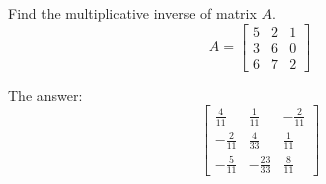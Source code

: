 
\begin{question}
Find the multiplicative inverse of matrix \(A\).
\[A = \left[\begin{matrix}5 & 2 & 1\\3 & 6 & 0\\6 & 7 & 2\end{matrix}\right]\]
\end{question}

\begin{solution}
The answer:
\[\left[\begin{matrix}\frac{4}{11} & \frac{1}{11} & - \frac{2}{11}\\- \frac{2}{11} & \frac{4}{33} & \frac{1}{11}\\- \frac{5}{11} & - \frac{23}{33} & \frac{8}{11}\end{matrix}\right]\]
\end{solution}

